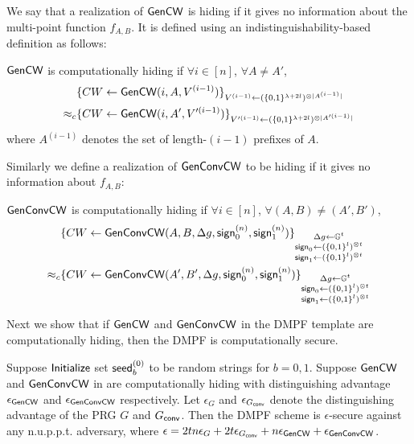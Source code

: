 We say that a realization of ${\sf Gen}{\sf CW}$ is hiding if it gives no information about the multi-point function $f_{A,B}$. It is defined using an indistinguishability-based definition as follows: 
\begin{definition}\label{def:GenCW_hiding}
    ${\sf Gen}{\sf CW}$ is computationally hiding if $\forall i\in[n]$, $\forall A\not=A'$,
    \[
        \begin{split}
            &\{CW\gets {\sf Gen}{\sf CW}(i,A,V^{(i-1)})\}_{V^{(i-1)}\gets(\{0,1\}^{\lambda+2l})^{\otimes |A^{(i-1)}|}}\\\approx_c&\{CW\gets {\sf Gen}{\sf CW}(i,A',V'^{(i-1)})\}_{V'^{(i-1)}\gets(\{0,1\}^{\lambda+2l})^{\otimes |A'^{(i-1)}|}}
        \end{split}
    \]
    where $A^{(i-1)}$ denotes the set of length-$(i-1)$ prefixes of $A$. 
\end{definition}
Similarly we define a realization of ${\sf Gen}{\sf Conv}{\sf CW}$ to be hiding if it gives no information about $f_{A,B}$: 
\begin{definition}\label{def:GenConvCW_hiding}
    $\,$\\${\sf Gen}{\sf Conv}{\sf CW}$ is computationally hiding if $\forall i\in[n]$, $\forall (A,B)\not=(A',B')$, 
    \[
        \begin{split}
            &\{CW\gets {\sf Gen}{\sf Conv}{\sf CW}(A,B,\Delta g, {\sf sign}_0^{(n)}, {\sf sign}_1^{(n)})\}_{\substack{
                \Delta g\gets \mathbb{G}^t\\{\sf sign}_0\gets (\{0,1\}^l)^{\otimes t}\\{\sf sign}_1\gets (\{0,1\}^l)^{\otimes t}}}\\\approx_c&\{CW\gets {\sf Gen}{\sf Conv}{\sf CW}(A',B',\Delta g, {\sf sign}_0^{(n)}, {\sf sign}_1^{(n)})\}_{\substack{
                    \Delta g\gets \mathbb{G}^t\\{\sf sign}_0\gets (\{0,1\}^l)^{\otimes t}\\{\sf sign}_1\gets (\{0,1\}^l)^{\otimes t}}}
        \end{split}
    \]
\end{definition}
Next we show that if ${\sf Gen}{\sf CW}$ and ${\sf Gen}{\sf Conv}{\sf CW}$ in the DMPF template  are computationally hiding, then the DMPF is computationally secure. 
\begin{lemma}\label{lem:template_secure}
    Suppose ${\sf Initialize}$ set ${\sf seed}_b^{(0)}$ to be random strings for $b=0,1$. Suppose  ${\sf Gen}{\sf CW}$ and ${\sf Gen}{\sf Conv}{\sf CW}$ in  are computationally hiding with distinguishing advantage $\epsilon_{{\sf Gen}{\sf CW}}$ and $\epsilon_{{\sf Gen}{\sf Conv}{\sf CW}}$ respectively. Let $\epsilon_G$ and $\epsilon_{G_{\sf conv}}$ denote the distinguishing advantage of the PRG $G$ and $G_{\sf conv}$. Then the DMPF scheme is $\epsilon$-secure against any n.u.p.p.t. adversary, where $\epsilon = 2tn\epsilon_{G}+2t \epsilon_{G_{\sf conv}}+n\epsilon_{{\sf Gen}{\sf CW}} +\epsilon_{{\sf Gen}{\sf Conv}{\sf CW}}$. 
\end{lemma}
